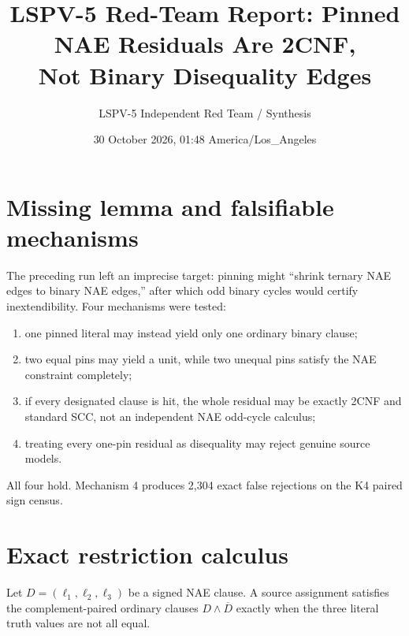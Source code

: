 \documentclass[11pt]{article}
\title{LSPV-5 Red-Team Report: Pinned NAE Residuals Are 2CNF,\\
Not Binary Disequality Edges}
\author{LSPV-5 Independent Red Team / Synthesis}
\date{30 October 2026, 01:48 America/Los\_Angeles}
\begin{document}
\maketitle

\begin{center}
\end{center}

\section{Missing lemma and falsifiable mechanisms}

The preceding run left an imprecise target: pinning might ``shrink ternary NAE
edges to binary NAE edges,'' after which odd binary cycles would certify
inextendibility.  Four mechanisms were tested:
\begin{enumerate}
\item one pinned literal may instead yield only one ordinary binary clause;
\item two equal pins may yield a unit, while two unequal pins satisfy the NAE
constraint completely;
\item if every designated clause is hit, the whole residual may be exactly
2CNF and standard SCC, not an independent NAE odd-cycle calculus;
\item treating every one-pin residual as disequality may reject genuine source
models.
\end{enumerate}
All four hold.  Mechanism 4 produces 2,304 exact false rejections on the K4
paired sign census.

\section{Exact restriction calculus}

Let $D=(\ell_1,\ell_2,\ell_3)$ be a signed NAE clause.  A source assignment
satisfies the complement-paired ordinary clauses $D\wedge\overline D$ exactly
when the three literal truth values are not all equal.
\end{document}
